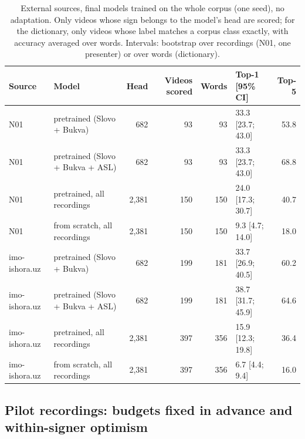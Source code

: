 \documentclass[a4paper,fleqn]{cas-dc}
\begin{document}
\begin{table}[t]
\caption{External sources, final models trained on the whole corpus (one seed), no adaptation. Only videos whose sign belongs to the model's head are scored; for the dictionary, only videos whose label matches a corpus class exactly, with accuracy averaged over words. Intervals: bootstrap over recordings (N01, one presenter) or over words (dictionary).}\label{tab:external}
\footnotesize
\centering
\begin{tabular}{llrrrlr}
\toprule
\textbf{Source} & \textbf{Model} & \textbf{Head} & \textbf{Videos scored} & \textbf{Words} & \textbf{Top-1 [95\% CI]} & \textbf{Top-5} \\
\midrule
N01 & pretrained (Slovo + Bukva) & 682 & 93 & 93 & 33.3 [23.7; 43.0] & 53.8 \\
N01 & pretrained (Slovo + Bukva + ASL) & 682 & 93 & 93 & 33.3 [23.7; 43.0] & 68.8 \\
N01 & pretrained, all recordings & 2,381 & 150 & 150 & 24.0 [17.3; 30.7] & 40.7 \\
N01 & from scratch, all recordings & 2,381 & 150 & 150 & 9.3 [4.7; 14.0] & 18.0 \\
imo-ishora.uz & pretrained (Slovo + Bukva) & 682 & 199 & 181 & 33.7 [26.9; 40.5] & 60.2 \\
imo-ishora.uz & pretrained (Slovo + Bukva + ASL) & 682 & 199 & 181 & 38.7 [31.7; 45.9] & 64.6 \\
imo-ishora.uz & pretrained, all recordings & 2,381 & 397 & 356 & 15.9 [12.3; 19.8] & 36.4 \\
imo-ishora.uz & from scratch, all recordings & 2,381 & 397 & 356 & 6.7 [4.4; 9.4] & 16.0 \\
\bottomrule
\end{tabular}
\end{table}

\hypertarget{pilot-recordings-budgets-fixed-in-advance-and-within-signer-optimism}{%
\subsection{Pilot recordings: budgets fixed in advance and within-signer optimism}\label{pilot-recordings-budgets-fixed-in-advance-and-within-signer-optimism}}
\end{document}
